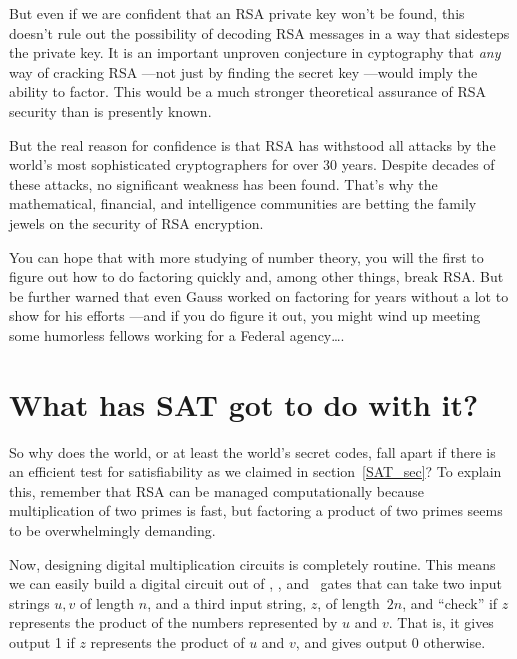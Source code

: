 But even if we are confident that an RSA private key won't be found,
this doesn't rule out the possibility of decoding RSA messages in a
way that sidesteps the private key.  It is an important unproven
conjecture in cyptography that \emph{any} way of cracking RSA ---not
just by finding the secret key ---would imply the ability to factor.
This would be a much stronger theoretical assurance of RSA security
than is presently known.

But the real reason for confidence is that RSA has withstood all
attacks by the world's most sophisticated cryptographers for over 30
years.  Despite decades of these attacks, no significant weakness has
been found.  That's why the mathematical, financial, and intelligence
communities are betting the family jewels on the security of RSA
encryption.

You can hope that with more studying of number theory, you will the
first to figure out how to do factoring quickly and, among other
things, break RSA.  But be further warned that even Gauss worked on
factoring for years without a lot to show for his efforts ---and if
you do figure it out, you might wind up meeting some humorless fellows
working for a Federal agency\dots.

\begin{problems}
\classproblems
{}

\homeworkproblems
{}
\end{problems}

\section{What has SAT got to do with it?}\label{SAT_RSA_sec}
So why does the world, or at least the world's secret codes, fall
apart if there is an efficient test for satisfiability as we claimed
in section~\ref{SAT_sec}?  To explain this, remember that RSA can be
managed computationally because multiplication of two primes is fast,
but factoring a product of two primes seems to be overwhelmingly
demanding.

Now, designing digital multiplication circuits is completely routine.
This means we can easily build a digital circuit out of \QAND, \QOR,
and \QNOT\ gates that can take two input strings $u,v$ of length $n$,
and a third input string, $z$, of length~$2n$, and ``check'' if $z$
represents the product of the numbers represented by $u$ and $v$.
That is, it gives output 1 if $z$ represents the product of $u$ and
$v$, and gives output 0 otherwise.

